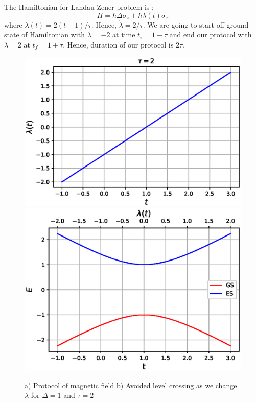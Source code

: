 \documentclass[11pt,a4paper]{article}
\begin{document}
The Hamiltonian for Landau-Zener problem is :
\begin{equation}
H= \hbar \Delta \sigma_z + \hbar \lambda(t) \sigma_x
\end{equation}
where $\lambda(t)= 2(t-1)/\tau$. Hence, $\dot{\lambda}= 2/\tau$. We are going to start off ground-state of Hamiltonian with $\lambda=-2$ at time $t_i= 1- \tau$ and end our protocol with  $\lambda=2$ at $t_f= 1+ \tau$. Hence, duration of our protocol is $2 \tau$. 

\begin{figure}[!ht]
\begin{center}
 \includegraphics[scale=0.5]{pics/lambda_LZ.eps} 
\includegraphics[scale=0.5]{pics/energy_LZ.eps} 
\caption{a) Protocol of magnetic field b) Avoided level crossing as we change $\lambda$ for $\Delta=1$ and $\tau=2$ }
\label{ev_lz}
\end{center}
\end{figure}
\end{document}
